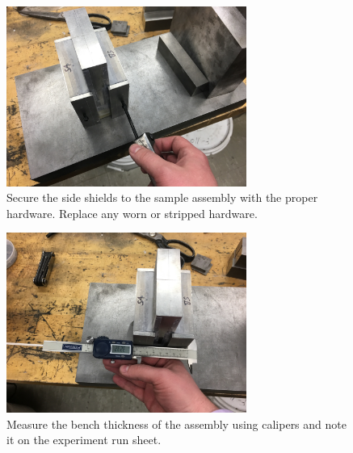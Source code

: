 \clearpage

\begin{figure}
	\centering
        \includegraphics[width=0.7\textwidth]{appendix_sample_prep/dds_side_shields.jpg}
   	\caption{Secure the side shields to the sample assembly with the proper hardware. Replace any worn or stripped hardware.}
  	\label{Fig:dds_side_shields}
\end{figure}

\begin{figure}
	\centering
        \includegraphics[width=0.7\textwidth]{appendix_sample_prep/dds_measure_sample.jpg}
   	\caption{Measure the bench thickness of the assembly using calipers and note it on the experiment run sheet.}
  	\label{Fig:dds_measure_sample}
\end{figure}

